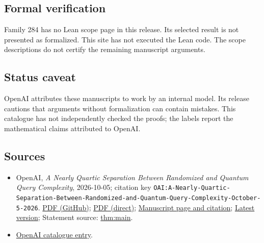 \documentclass[11pt]{article}
\begin{document}
\subsection{Formal verification}
Family 284 has no Lean scope page in this release. Its selected result is not presented as formalized. This site has not executed the Lean code. The scope descriptions do not certify the remaining manuscript arguments.

\subsection{Status caveat}
OpenAI attributes these manuscripts to work by an internal model. Its release cautions that arguments without formalization can contain mistakes. This catalogue has not independently checked the proofs; the labels report the mathematical claims attributed to OpenAI.

\subsection{Sources}
\begin{itemize}
\item OpenAI, \emph{A Nearly Quartic Separation Between Randomized and Quantum Query Complexity}, 2026-10-05; citation key \texttt{OAI:A-Nearly-Quartic-Separation-Between-Randomized-and-Quantum-Query-Complexity-October-5-2026}. \href{https://github.com/openai/math/blob/adc7f1241b42e322a6451854ab7e4b4c146bf78a/preprints/A-Nearly-Quartic-Separation-Between-Randomized-and-Quantum-Query-Complexity-October-5-2026/quartic-query-separation.pdf}{PDF (GitHub)}; \href{https://github.com/openai/math/raw/adc7f1241b42e322a6451854ab7e4b4c146bf78a/preprints/A-Nearly-Quartic-Separation-Between-Randomized-and-Quantum-Query-Complexity-October-5-2026/quartic-query-separation.pdf}{PDF (direct)}; \href{https://github.com/openai/math/blob/adc7f1241b42e322a6451854ab7e4b4c146bf78a/preprints/A-Nearly-Quartic-Separation-Between-Randomized-and-Quantum-Query-Complexity-October-5-2026/README.md}{Manuscript page and citation}; \href{https://github.com/openai/math/blob/main/preprints/A-Nearly-Quartic-Separation-Between-Randomized-and-Quantum-Query-Complexity-October-5-2026/quartic-query-separation.pdf}{Latest version}; Statement source: \href{https://github.com/openai/math/blob/adc7f1241b42e322a6451854ab7e4b4c146bf78a/preprints/A-Nearly-Quartic-Separation-Between-Randomized-and-Quantum-Query-Complexity-October-5-2026/build/sections/01-introduction.tex\#L29}{thm:main}.
\item \href{https://github.com/openai/math/blob/adc7f1241b42e322a6451854ab7e4b4c146bf78a/CONTENTS.md}{OpenAI catalogue entry}.
\end{itemize}
\end{document}
